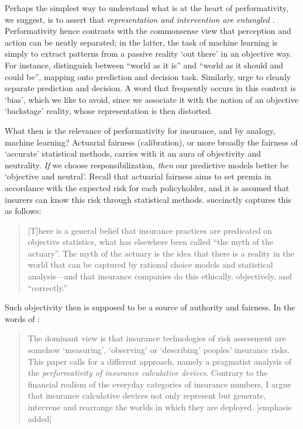 \documentclass[11pt]{article} %
\begin{document}
Perhaps the simplest way to understand what is at the heart of performativity, we suggest, is to assert that \textit{representation and intervention are entangled} \citep{vosselman2014performativity}. 
Performativity hence contrasts with the commonsense view that perception and action can be neatly separated; in the latter, the task of machine learning is simply to extract patterns from a passive reality `out there' in an objective way.
For instance, \citet{mitchell2021algorithmic} distinguish between ``world as it is'' and ``world as it should and could be'', mapping onto prediction and decision task. Similarly, \citet{kuppler2021distributive} urge to cleanly separate prediction and decision.
A word that frequently occurs in this context is `bias', which we like to avoid, since we associate it with the notion of an objective `backstage' reality, whose representation is then distorted. 

What then is the relevance of performativity for insurance, and by analogy, machine learning? Actuarial fairness (calibration), or more broadly the fairness of `accurate' statistical methods, carries with it an aura of objectivity and neutrality. \textit{If} we choose responsibilization, \textit{then} our predictive models better be `objective and neutral'. Recall that actuarial fairness aims to set premia in accordance with the expected risk for each policyholder, and it is assumed that insurers can know this risk through statistical methods. \citet{glenn2003postmodernism} succinctly captures this as follows:
\begin{quote}
    [T]here is a general belief that
insurance practices are predicated on objective statistics, what has elsewhere been called
“the myth of the actuary”. The myth of the actuary is the idea that there
is a reality in the world that can be captured by rational choice models and statistical
analysis—and that insurance companies do this ethically, objectively, and “correctly.”
\end{quote}
Such objectivity then is supposed to be a source of authority and fairness. In the words of \citet{van2014politics}:
\begin{quote}
    The dominant view is that
insurance technologies of risk assessment are somehow ‘measuring’, ‘observing’ or
‘describing’ peoples’ insurance risks. This paper calls for a different approach, namely a
pragmatist analysis of the \textit{performativity of insurance calculative devices}. Contrary to the
financial realism of the everyday categories of insurance numbers, I argue that insurance
calculative devices not only represent but generate, intervene and rearrange the worlds in
which they are deployed. [emphasis added]
\end{quote}
\end{document}
